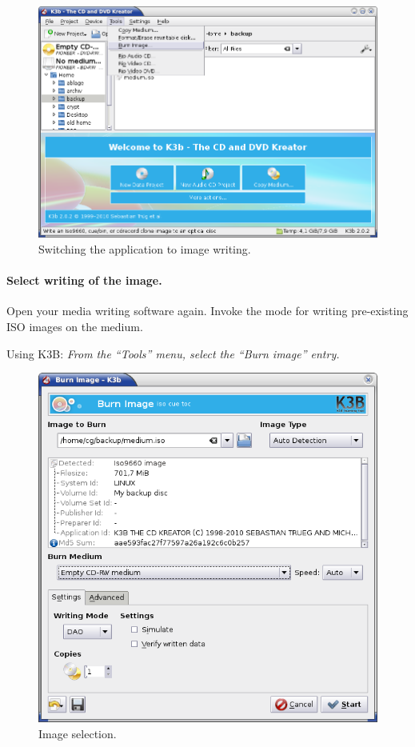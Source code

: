 \begin{figure}[h]
\centerline{\includegraphics[width=\textwidth]{screenshots/write-iso1.png}}
\caption{Switching the application to image writing.}  
\label{howto-augment-write-iso-prepare}
\end{figure}

\paragraph{Select writing of the image.} Open your media writing
software again. Invoke the mode for writing pre-existing ISO images
on the medium.

\bigskip

Using K3B: {\em From the ``Tools'' menu, select the ``Burn image'' entry.} 

\newpage
\begin{figure}[h]
\centerline{\includegraphics[width=\textwidth]{screenshots/write-iso2.png}}
\caption{Image selection.}  
\label{howto-augment-write-iso-select}
\end{figure}

